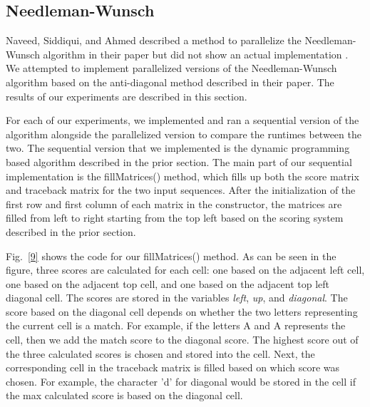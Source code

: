 \documentclass[conference]{IEEEtran}
\begin{document}
\setcounter{subsection}{0}

\subsection{Needleman-Wunsch}
Naveed, Siddiqui, and Ahmed described a method to parallelize the Needleman-Wunsch algorithm in their paper but did not show an actual implementation \cite{naveed_siddiqui_ahmed}. We attempted to implement parallelized versions of the Needleman-Wunsch algorithm based on the anti-diagonal method described in their paper. The results of our experiments are described in this section.

For each of our experiments, we implemented and ran a sequential version of the algorithm alongside the parallelized version to compare the runtimes between the two. The sequential version that we implemented is the dynamic programming based algorithm described in the prior section. The main part of our sequential implementation is the fillMatrices() method, which fills up both the score matrix and traceback matrix for the two input sequences. After the initialization of the first row and first column of each matrix in the constructor, the matrices are filled from left to right starting from the top left based on the scoring system described in the prior section.

Fig.~\ref{9} shows the code for our fillMatrices() method. As can be seen in the figure, three scores are calculated for each cell: one based on the adjacent left cell, one based on the adjacent top cell, and one based on the adjacent top left diagonal cell. The scores are stored in the variables \emph{left}, \emph{up}, and \emph{diagonal}. The score based on the diagonal cell depends on whether the two letters representing the current cell is a match. For example, if the letters A and A represents the cell, then we add the match score to the diagonal score. The highest score out of the three calculated scores is chosen and stored into the cell. Next, the corresponding cell in the traceback matrix is filled based on which score was chosen. For example, the character 'd' for diagonal would be stored in the cell if the max calculated score is based on the diagonal cell.
\end{document}
